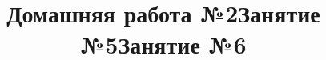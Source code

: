 \newpage
\title{Домашняя работа №2}
\begin{listofex}
	\item {}
	\item {}
	\item {}
	\item {}
	\item {}
	\item {}
	\item {}
\end{listofex}
\newpage
\title{Занятие №5}
\begin{listofex}
	\item {}
	\item {}
	\item {}
	\item {}
	\item {}
	\item {}
	\item {}
	\item {}
\end{listofex}
\newpage
\title{Занятие №6}
\begin{listofex}
	\item {}
	\item {}
	\item {}
	\item {}
	\item {}
	\item {}
	\item[\loeitem{7*}] 
	\item[\loeitem{8*}] 
\end{listofex}
%
%
